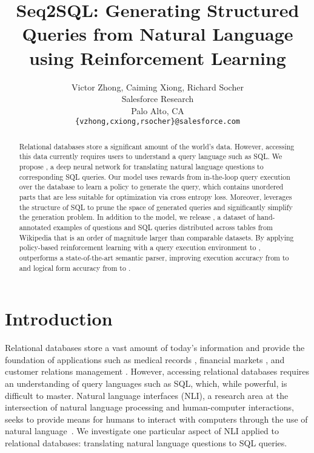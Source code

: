 \documentclass{article} %
\title{Seq2SQL: Generating Structured Queries from Natural Language using Reinforcement Learning}
\author{Victor Zhong, Caiming Xiong, Richard Socher \\
Salesforce Research \\
Palo Alto, CA \\
\texttt{\{vzhong,cxiong,rsocher\}@salesforce.com}
}
\begin{document}



\maketitle

\begin{abstract}
Relational databases store a significant amount of the world’s data.
However, accessing this data currently requires users to understand a query language such as SQL. We propose \model, a deep neural network for translating natural language questions to corresponding SQL queries.
Our model uses rewards from in-the-loop query execution over the database to learn a policy to generate the query, which contains unordered parts that are less suitable for optimization via cross entropy loss.
Moreover, \model leverages the structure of SQL to prune the space of generated queries and significantly simplify the generation problem.
In addition to the model, we release \dataset, a dataset of \numinstances hand-annotated examples of questions and SQL queries distributed across \numtables tables from Wikipedia that is an order of magnitude larger than comparable datasets.
By applying policy-based reinforcement learning with a query execution environment to \dataset, \model outperforms a state-of-the-art semantic parser, improving execution accuracy from \perfeaseqtoseq to \perfeaours and logical form accuracy from \perflaseqtoseq to \perflaours.
\end{abstract}


\section{Introduction}

Relational databases store a vast amount of today's information and provide the foundation of applications such as medical records \citep{hillestad2005can}, financial markets \citep{beck2000new}, and customer relations management \citep{ngai2009application}.
However, accessing relational databases requires an understanding of query languages such as SQL, which, while powerful, is difficult to master.
Natural language interfaces (NLI), a research area at the intersection of natural language processing and human-computer interactions, seeks to provide means for humans to interact with computers through the use of natural language~\citep{IAndroutsopoulos1995NaturalLI}.
We investigate one particular aspect of NLI applied to relational databases: translating natural language questions to SQL queries.
\end{document}
